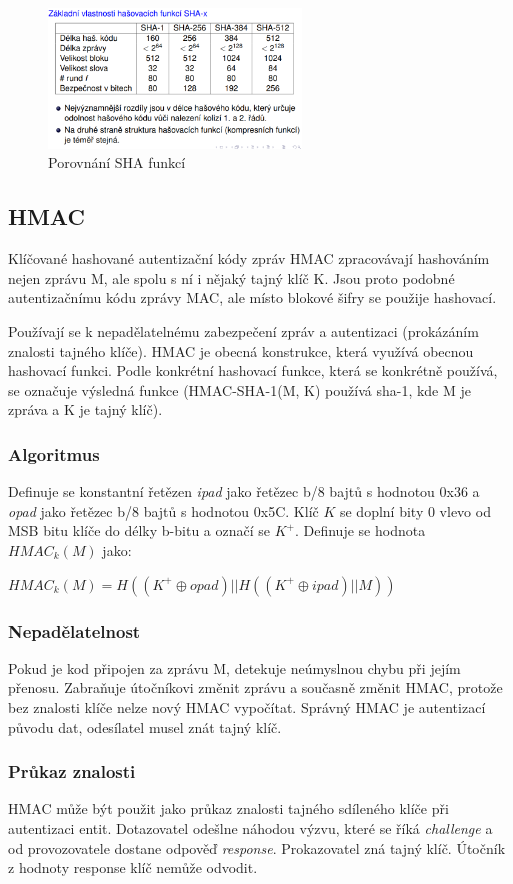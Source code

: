 \documentclass{szzclass}
\begin{document}
\begin{figure}[h!]
    \centering
    \includegraphics[width=0.6\textwidth]{topics/bi-spol-06/image/shaCompare.png}
    \caption{Porovnání SHA funkcí}
\end{figure}

\subsection{HMAC}
Klíčované hashované autentizační kódy zpráv HMAC zpracovávají hashováním nejen zprávu M, ale spolu s ní i nějaký tajný klíč K.
Jsou proto podobné autentizačnímu kódu zprávy MAC, ale místo blokové šifry se použije hashovací.

Používají se k nepadělatelnému zabezpečení zpráv a autentizaci (prokázáním znalosti tajného klíče). HMAC je obecná konstrukce, která využívá obecnou hashovací funkci.
Podle konkrétní hashovací funkce, která se konkrétně používá, se označuje výsledná funkce (HMAC-SHA-1(M, K) používá sha-1, kde M je zpráva a K je tajný klíč).
\subsubsection{Algoritmus}
Definuje se konstantní řetězen \textit{ipad} jako řetězec b/8 bajtů s hodnotou 0x36 a \textit{opad} jako řetězec b/8 bajtů s hodnotou 0x5C.
Klíč $K$ se doplní bity 0 vlevo od MSB bitu klíče do délky b-bitu a označí se $K^+$. Definuje se hodnota $HMAC_k(M)$ jako:
\begin{center}
$HMAC_k(M) = H((K^+ \oplus opad)||H((K^+ \oplus ipad)||M))$
\end{center}
\subsubsection{Nepadělatelnost}
Pokud je kod připojen za zprávu M, detekuje neúmyslnou chybu při jejím přenosu. Zabraňuje útočníkovi změnit zprávu a současně změnit HMAC, protože
bez znalosti klíče nelze nový HMAC vypočítat. Správný HMAC je autentizací původu dat, odesílatel musel znát tajný klíč.
\subsubsection{Průkaz znalosti}
HMAC může být použit jako průkaz znalosti tajného sdíleného klíče při autentizaci entit. Dotazovatel odešlne náhodou výzvu, které se říká \textit{challenge}
a od provozovatele dostane odpověď \textit{response}. Prokazovatel zná tajný klíč. Útočník z hodnoty response klíč nemůže odvodit.
\end{document}
